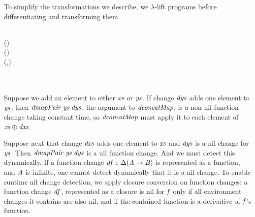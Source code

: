 To simplify the transformations we describe, we $\lambda$-lift
programs before differentiating and transforming them.
\begin{hscode}\SaveRestoreHook
{}%
%
%
%
%
\>[3]{}\;\;\mathrel{=}{}\<[E]%
\\
\>[3]{}\<[5]%
\>[5]{}\;(\;)\;\<[E]%
\\[\blanklineskip]%
\>[3]{}\;\mathrel{=}\lambda {}\to {}\;(\;)\;\<[E]%
\\[\blanklineskip]%
\>[3]{}\;\mathrel{=}\lambda {}\to (,){}\<[E]%
\\[\blanklineskip]%
\>[3]{}\;\;\mathrel{=}{}\<[E]%
\\
\>[3]{}\<[5]%
\>[5]{}\;{}\<[10]%
\>[10]{}\mathrel{=}\;\;\<[E]%
\\
\>[3]{}\<[5]%
\>[5]{}\;{}\<[10]%
\>[10]{}\;\<[E]%
\ColumnHook
\end{hscode}\resethooks
{}
Suppose we add an element to either \ensuremath{\Varid{xs}} or \ensuremath{\Varid{ys}}.
If change \ensuremath{\Varid{dys}} adds one element to \ensuremath{\Varid{ys}}, then \ensuremath{\Varid{dmapPair}\;\Varid{ys}\;\Varid{dys}}, the argument
to \ensuremath{\Varid{dconcatMap}}, is a non-nil function change taking constant time, so \ensuremath{\Varid{dconcatMap}}
must apply it to each element of \ensuremath{\Varid{xs}\oplus \Varid{dxs}}.

Suppose next that change \ensuremath{\Varid{dxs}} adds one element to \ensuremath{\Varid{xs}} and \ensuremath{\Varid{dys}} is a nil change
for \ensuremath{\Varid{ys}}. Then \ensuremath{\Varid{dmapPair}\;\Varid{ys}\;\Varid{dys}} is a nil function change. And we must detect
this dynamically.
If a function change \ensuremath{\Varid{df}\mathrel{:\mkern-1mu:}\Delta (\Conid{A}\to \Conid{B})} is represented as a
function, and \ensuremath{\Conid{A}} is infinite, one cannot detect dynamically that it is a nil change.
To enable runtime nil change detection, we apply closure
conversion on function changes: a function change \ensuremath{\Varid{df}}, represented as a closure is
nil for \ensuremath{\Varid{f}} only if all environment changes it contains are also nil, and if the
contained function is a derivative of \ensuremath{\Varid{f}}'s function.
